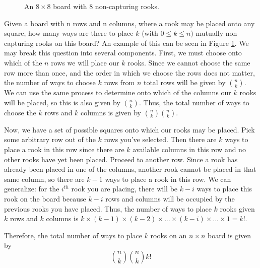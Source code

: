 \documentclass{article}
\newcommand{\w}{0.5}
\newcommand{\ww}{0.25}
\newcommand{\drawgraygrid}[2]{\fill[fill=gray!40!white] (0,0) rectangle (#1*\w,#2*\w); \draw[step=\w cm,black,thin] (0,0) grid (#1*\w,#2*\w);}
\newcommand{\placerook}[2]{\draw (#1*\w cm - \ww cm, #2*\w cm - \ww cm) node {$R$};}
\begin{document}
\begin{figure}
    \centering
    \caption{An $8 \times 8$ board with $8$ non-capturing rooks.}
    \label{chessboard}
\end{figure}

Given a board with n rows and n columns, where a rook may be placed onto any square, how many ways are there to place $k$ (with $0 \leq k \leq n)$ mutually non-capturing rooks on this board? An example of this can be seen in Figure \ref{chessboard}. We may break this question into several components. First, we must choose onto which of the $n$ rows we will place our $k$ rooks. Since we cannot choose the same row more than once, and the order in which we choose the rows does not matter, the number of ways to choose $k$ rows from $n$ total rows will be given by $\binom{n}{k}$. We can use the same process to determine onto which of the columns our $k$ rooks will be placed, so this is also given by $\binom{n}{k}$. Thus, the total number of ways to choose the $k$ rows and $k$ columns is given by $\binom{n}{k}\binom{n}{k}$.

Now, we have a set of possible squares onto which our rooks may be placed. Pick some arbitrary row out of the $k$ rows you've selected. Then there are $k$ ways to place a rook in this row since there are $k$ available columns in this row and no other rooks have yet been placed. Proceed to another row. Since a rook has already been placed in one of the columns, another rook cannot be placed in that same column, so there are $k-1$ ways to place a rook in this row. We can generalize: for the $i^{th}$ rook you are placing, there will be $k-i$ ways to place this rook on the board because $k-i$ rows and columns will be occupied by the previous rooks you have placed. Thus, the number of ways to place $k$ rooks given $k$ rows and $k$ columns is $k \times (k-1) \times (k-2) \times ... \times (k - i) \times ... \times 1 = k!$.

Therefore, the total number of ways to place $k$ rooks on an $n \times n$ board is given by \begin{equation} \label{unrestricted}
    \binom{n}{k} \binom{n}{k} k!
\end{equation}
\end{document}
